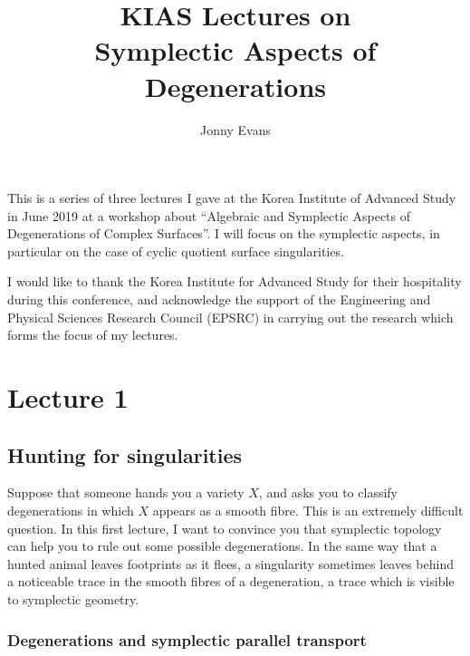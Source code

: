 \documentclass{article}
\title{KIAS Lectures on\\ Symplectic Aspects of Degenerations}
\author{Jonny Evans}
\begin{document}
\maketitle
This is a series of three lectures I gave at the Korea Institute of
Advanced Study in June 2019 at a workshop about ``Algebraic and
Symplectic Aspects of Degenerations of Complex Surfaces''. I will
focus on the symplectic aspects, in particular on the case of cyclic
quotient surface singularities.


I would like to thank the Korea Institute for Advanced Study for their
hospitality during this conference, and acknowledge the support of the
Engineering and Physical Sciences Research Council (EPSRC) in carrying
out the research which forms the focus of my lectures.


\section{Lecture 1}


\subsection{Hunting for singularities}


Suppose that someone hands you a variety \(X\), and asks you to
classify degenerations in which \(X\) appears as a smooth fibre. This
is an extremely difficult question. In this first lecture, I want to
convince you that symplectic topology can help you to rule out some
possible degenerations. In the same way that a hunted animal leaves
footprints as it flees, a singularity sometimes leaves behind a
noticeable trace in the smooth fibres of a degeneration, a trace which
is visible to symplectic geometry.


\subsubsection{Degenerations and symplectic parallel transport}
\end{document}
